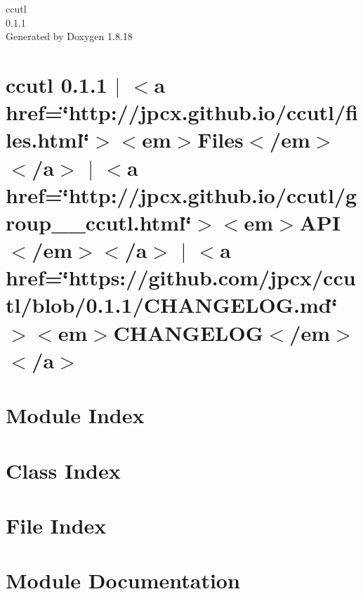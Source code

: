\let\mypdfximage\pdfximage\def\pdfximage{\immediate\mypdfximage}\documentclass[twoside]{book}
\newcommand{\+}{\discretionary{\mbox{\scriptsize$\hookleftarrow$}}{}{}}
\newcommand{\clearemptydoublepage}{%
  \newpage{\pagestyle{empty}\cleardoublepage}%
}
\begin{document}
\hypersetup{pageanchor=false,
             bookmarksnumbered=true,
             pdfencoding=unicode
            }
\begin{titlepage}
\vspace*{7cm}
\begin{center}%
{\Large ccutl \\[1ex]\large 0.\+1.\+1 }\\
\vspace*{1cm}
{\large Generated by Doxygen 1.8.18}\\
\end{center}
\end{titlepage}
\clearemptydoublepage
{}
\tableofcontents
\clearemptydoublepage
{}
\hypersetup{pageanchor=true}

\chapter{ccutl 0.1.1 $\vert$ $<$a href=\char`\"{}http\+://jpcx.\+github.\+io/ccutl/files.\+html\char`\"{}$>$$<$em$>$Files$<$/em$>$$<$/a$>$ $\vert$ $<$a href=\char`\"{}http\+://jpcx.\+github.\+io/ccutl/group\+\_\+\+\_\+ccutl.\+html\char`\"{}$>$$<$em$>$A\+PI$<$/em$>$$<$/a$>$ $\vert$ $<$a href=\char`\"{}https\+://github.\+com/jpcx/ccutl/blob/0.\+1.\+1/\+C\+H\+A\+N\+G\+E\+L\+O\+G.\+md\char`\"{}$>$$<$em$>$C\+H\+A\+N\+G\+E\+L\+OG$<$/em$>$$<$/a$>$}
\label{index}\hypertarget{index}{}
\chapter{Module Index}

\chapter{Class Index}

\chapter{File Index}

\chapter{Module Documentation}



\end{document}
